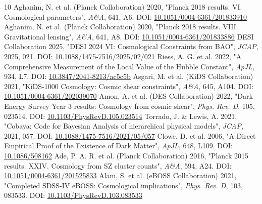 \documentclass[11pt,a4paper]{article}
\begin{document}
\begin{thebibliography}{10}
 Aghanim, N. et al. (Planck Collaboration) 2020, "Planck 2018 results. VI. Cosmological parameters", \emph{A\&A}, 641, A6. DOI: \href{https://doi.org/10.1051/0004-6361/201833910}{10.1051/\allowbreak{}0004-6361/\allowbreak{}201833910}
 Aghanim, N. et al. (Planck Collaboration) 2020, "Planck 2018 results. VIII. Gravitational lensing", \emph{A\&A}, 641, A8. DOI: \href{https://doi.org/10.1051/0004-6361/201833886}{10.1051/\allowbreak{}0004-6361/\allowbreak{}201833886}
 DESI Collaboration 2025, "DESI 2024 VI: Cosmological Constraints from BAO", \emph{JCAP}, 2025, 021. DOI: \href{https://doi.org/10.1088/1475-7516/2025/02/021}{10.1088/\allowbreak{}1475-7516/\allowbreak{}2025/\allowbreak{}02/\allowbreak{}021}
 Riess, A. G. et al. 2022, "A Comprehensive Measurement of the Local Value of the Hubble Constant", \emph{ApJL}, 934, L7. DOI: \href{https://doi.org/10.3847/2041-8213/ac5c5b}{10.3847/\allowbreak{}2041-8213/\allowbreak{}ac5c5b}
 Asgari, M. et al. (KiDS Collaboration) 2021, "KiDS-1000 Cosmology: Cosmic shear constraints", \emph{A\&A}, 645, A104. DOI: \href{https://doi.org/10.1051/0004-6361/202039070}{10.1051/\allowbreak{}0004-6361/\allowbreak{}202039070}
 Amon, A. et al. (DES Collaboration) 2022, "Dark Energy Survey Year 3 results: Cosmology from cosmic shear", \emph{Phys. Rev. D}, 105, 023514. DOI: \href{https://doi.org/10.1103/PhysRevD.105.023514}{10.1103/\allowbreak{}PhysRevD.105.023514}
 Torrado, J. \& Lewis, A. 2021, "Cobaya: Code for Bayesian Analysis of hierarchical physical models", \emph{JCAP}, 2021, 057. DOI: \href{https://doi.org/10.1088/1475-7516/2021/05/057}{10.1088/\allowbreak{}1475-7516/\allowbreak{}2021/\allowbreak{}05/\allowbreak{}057}
 Clowe, D. et al. 2006, "A Direct Empirical Proof of the Existence of Dark Matter", \emph{ApJL}, 648, L109. DOI: \href{https://doi.org/10.1086/508162}{10.1086/\allowbreak{}508162}
 Ade, P. A. R. et al. (Planck Collaboration) 2016, "Planck 2015 results. XXIV. Cosmology from SZ cluster counts", \emph{A\&A}, 594, A24. DOI: \href{https://doi.org/10.1051/0004-6361/201525833}{10.1051/\allowbreak{}0004-6361/\allowbreak{}201525833}
 Alam, S. et al. (eBOSS Collaboration) 2021, "Completed SDSS-IV eBOSS: Cosmological implications", \emph{Phys. Rev. D}, 103, 083533. DOI: \href{https://doi.org/10.1103/PhysRevD.103.083533}{10.1103/\allowbreak{}PhysRevD.103.083533}
\end{thebibliography}
\end{document}
